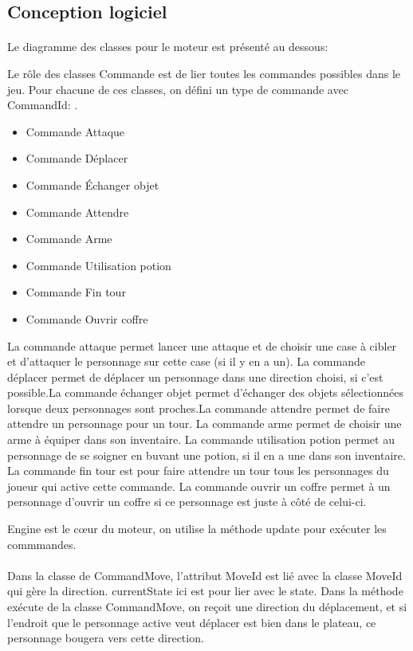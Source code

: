 \documentclass[a4paper,12pt]{article}
\begin{document}
\subsection{Conception logiciel}
\paragraph{}Le diagramme des classes pour le moteur est présenté au dessous:

Le rôle des classes Commande est de lier toutes les commandes possibles dans le jeu. Pour chacune de ces classes, on défini un type de commande avec CommandId:
.\begin{itemize}
\item Commande Attaque
\item Commande Déplacer
\item Commande Échanger objet
\item Commande Attendre
\item Commande Arme
\item Commande Utilisation potion
\item Commande Fin tour
\item Commande Ouvrir coffre

\end{itemize}

La commande attaque permet lancer une attaque et de choisir une case à cibler et d'attaquer le personnage sur cette case (si il y en a un). La commande déplacer permet de déplacer un personnage dans une direction choisi, si c'est possible.La commande échanger objet permet d'échanger des objets sélectionnées lorsque deux personnages sont proches.La commande
attendre permet de faire attendre un personnage pour un tour. La commande arme permet de choisir une arme à équiper dans son inventaire. La commande utilisation potion permet au personnage de se soigner en buvant une potion, si il en a une dans son inventaire. La commande fin tour est pour faire attendre un tour tous les personnages du joueur qui active cette commande. La commande ouvrir un coffre permet à un personnage d'ouvrir un coffre si ce personnage est juste à côté de celui-ci.    

Engine est le cœur du moteur, on utilise la méthode update pour exécuter les commmandes.
\paragraph{}
Dans la classe de CommandMove, l'attribut MoveId est lié avec la classe MoveId qui gère la direction. currentState ici est pour lier avec le state.
Dans la méthode exécute de la classe CommandMove, on reçoit une direction du déplacement, et si l'endroit que le personnage active veut déplacer est bien dans le plateau, ce personnage bougera vers cette direction.
\end{document}
